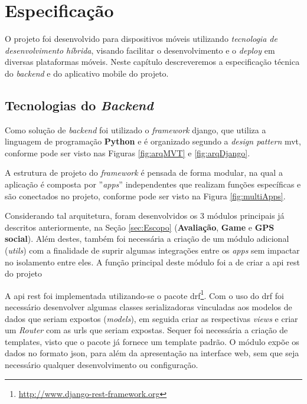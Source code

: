 \chapter{Especificação}\label{chp:Especificação}
O projeto foi desenvolvido para dispositivos móveis utilizando \textit{tecnologia de desenvolvimento híbrida}, visando facilitar o desenvolvimento e o \textit{deploy} em diversas plataformas móveis. Neste capítulo descreveremos a especificação técnica do \textit{backend} e do aplicativo mobile do projeto.

\section{Tecnologias do \textit{Backend}}\label{sec:spec-backend}
Como solução de \textit{backend} foi utilizado o \textit{framework} \gls{django}, que utiliza a linguagem de programação \textbf{Python} e é organizado segundo a \textit{design pattern} \gls{mvt}, conforme pode ser visto nas Figuras \ref{fig:arqMVT} e \ref{fig:arqDjango}.%
%
%
%

A estrutura de projeto do \textit{framework} é pensada de forma modular, na qual a aplicação é composta por ''\textit{apps}'' independentes que realizam funções específicas e são conectados no projeto, conforme pode ser visto na Figura \ref{fig:multiApps}.%
%

Considerando tal arquitetura, foram desenvolvidos os 3 módulos principais já descritos anteriormente, na Seção \ref{sec:Escopo} (\textbf{Avaliação}, \textbf{Game} e \textbf{GPS social}). Além destes, também foi necessária a criação de um módulo adicional (\textit{utils}) com a finalidade de suprir algumas integrações entre os \textit{apps} sem impactar no isolamento entre eles. A função principal deste módulo foi a de criar a \gls{api} \gls{rest} do projeto

A \gls{api} \gls{rest} foi implementada utilizando-se o pacote \gls{drf}\footnote{\url{http://www.django-rest-framework.org}}. Com o uso do \gls{drf} foi necessário desenvolver algumas classes serializadoras vinculadas aos modelos de dados que seriam expostos (\textit{models}), em seguida criar as respectivas \textit{views} e criar um \textit{Router} com as urls que seriam expostas. Sequer foi necessária a criação de templates, visto que o pacote já fornece um template padrão. O módulo expõe os dados no formato \gls{json}, para além da apresentação na interface web, sem que seja necessário qualquer desenvolvimento ou configuração.

